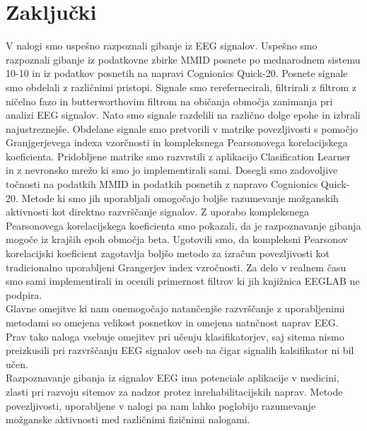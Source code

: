 \chapter{Zaključki}
V nalogi smo uspešno razpoznali gibanje iz EEG signalov. Uspešno smo razpoznali gibanje iz podatkovne zbirke MMID posnete po mednarodnem sistemu 10-10 in iz podatkov posnetih na napravi Cognionics Quick-20. Posnete signale smo obdelali z različnimi pristopi. Signale smo rerefernecirali, filtrirali z filtrom z ničelno fazo in butterworthovim filtrom na običanja območja zanimanja pri analizi EEG signalov. Nato smo signale razdelili na različno dolge epohe in izbrali najustreznejše. Obdelane signale smo pretvorili v matrike povezljivosti s pomočjo Granjgerjevega indexa vzorčnosti in kompleksnega Pearsonovega korelacijskega koeficienta. Pridobljene matrike smo razvrstili z aplikacijo Clasification Learner in z nevronsko mrežo ki smo jo implementirali sami. Dosegli smo zadovoljive točnosti na podatkih MMID in podatkih posnetih z napravo Cognionics Quick-20. Metode ki smo jih uporabljali omogočajo boljše razumevanje možganskih aktivnosti kot direktno razvrščanje signalov. Z uporabo kompleksnega Pearsonovega korelacijskega koeficienta smo pokazali, da je razpoznavanje gibanja mogoče iz krajših epoh območja beta. Ugotovili smo, da kompleksni Pearsonov korelacijski koeficient zagotavlja boljšo metodo za izračun povezljivosti kot tradicionalno uporabljeni Grangerjev index vzročnosti. Za delo v realnem času smo sami implementirali in ocenili primernost filtrov ki jih knjižnica EEGLAB ne podpira.\\
Glavne omejitve ki nam onemogočajo natančenjše razvrščanje z uporabljenimi metodami so omejena velikost posnetkov in omejena natnčnost naprav EEG. Prav tako naloga vsebuje omejitev pri učenju klasifikatorjev, saj sitema nismo preizkusili pri razvrščanju EEG signalov oseb na čigar signalih kalsifikator ni bil učen.\\
Razpoznavanje gibanja iz signalov EEG ima potenciale aplikacije v medicini, zlasti pri razvoju sitemov za nadzor protez inrehabilitacijskih naprav. Metode povezljivosti, uporabljene v nalogi pa nam lahko poglobijo razumevanje možganske aktivnosti med različnimi fizičnimi nalogami.